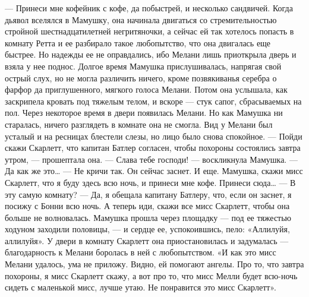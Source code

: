— Принеси мне кофейник с кофе, да побыстрей, и несколько сандвичей.
Когда дьявол вселялся в Мамушку, она начинала двигаться со стремительностью стройной шестнадцатилетней негритяночки, а сейчас ей так хотелось попасть в комнату Ретта и ее разбирало такое любопытство, что она двигалась еще быстрее. Но надежды ее не оправдались, ибо Мелани лишь приоткрыла дверь и взяла у нее поднос. Долгое время Мамушка прислушивалась, напрягая свой острый слух, но не могла различить ничего, кроме позвякиванья серебра о фарфор да приглушенного, мягкого голоса Мелани. Потом она услышала, как заскрипела кровать под тяжелым телом, и вскоре — стук сапог, сбрасываемых на пол. Через некоторое время в двери появилась Мелани. Но как Мамушка ни старалась, ничего разглядеть в комнате она не смогла. Вид у Мелани был усталый и на ресницах блестели слезы, но лицо было снова спокойное.
— Пойди скажи Скарлетт, что капитан Батлер согласен, чтобы похороны состоялись завтра утром, — прошептала она.
— Слава тебе господи! — воскликнула Мамушка. — Да как же это…
— Не кричи так. Он сейчас заснет. И еще. Мамушка, скажи мисс Скарлетт, что я буду здесь всю ночь, и принеси мне кофе. Принеси сюда…
— В эту самую комнату?
— Да, я обещала капитану Батлеру, что, если он заснет, я посижу с Бонни всю ночь. А теперь иди, скажи все мисс Скарлетт, чтобы она больше не волновалась.
Мамушка прошла через площадку — под ее тяжестью ходуном заходили половицы, — и сердце ее, успокоившись, пело: «Аллилуйя, аллилуйя». У двери в комнату Скарлетт она приостановилась и задумалась — благодарность к Мелани боролась в ней с любопытством.
«И как это мисс Мелани удалось, ума не приложу. Видно, ей помогают ангелы. Про то, что завтра похороны, я мисс Скарлетт скажу, а вот про то, что мисс Мелли будет всю-ночь сидеть с маленькой мисс, лучше утаю. Не понравится это мисс Скарлетт».

